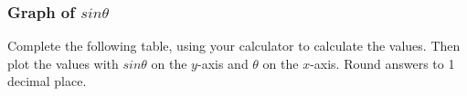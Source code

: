             \subsubsection{  Graph of $sin\theta $ }
            \nopagebreak
             \label{m39414*uid0983}Complete the following table, using your calculator to calculate the values. Then plot the values with $sin\theta $ on the $y$-axis and $\theta $ on the $x$-axis. Round answers to 1 decimal place.\par 
    \setlength\mytablespace{16\tabcolsep}
    \addtolength\mytablespace{9\arrayrulewidth}
    \setlength\mytablewidth{\linewidth}
